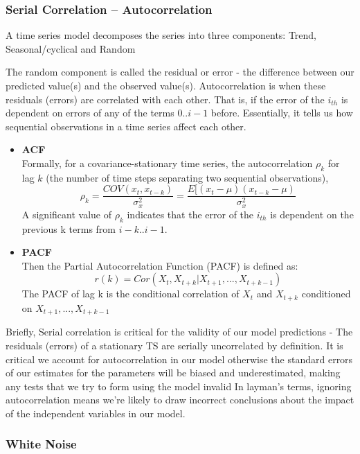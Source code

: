      	\subsubsection {Serial Correlation – Autocorrelation}
A time series model decomposes the series into three components: Trend, Seasonal/cyclical and Random

The random component is called the residual or error - the difference between our predicted value(s) and the observed value(s). Autocorrelation is when these residuals (errors) are correlated with each other. That is, if the error of the $i_{th}$ is dependent on errors of any of the terms $0 .. i-1$ before. Essentially, it tells us how sequential observations in a time series affect each other.
		\begin{itemize}
          \item  \textbf{ACF} \\
Formally, for a covariance-stationary time series, the autocorrelation $\rho_k$ for lag $k$ (the number of time steps separating two sequential observations), 
$$\rho_k = \frac{COV(x_t, x_{t - k})}{\sigma_x^2} = \frac{E[(x_t - \mu)(x_{t - k} - \mu)}{\sigma_x^2}$$ 
A significant value of $\rho_k$ indicates that the error of the $i_{th}$ is dependent on the previous k terms from ${i-k} .. {i-1}$. 
\\
          \item  \textbf{PACF} \\
Then the Partial Autocorrelation Function (PACF) is defined as:
$$r(k) = Cor(X_t,X_{t+k}|X_{t+1},...,X_{t+k-1})$$ 
The PACF of lag k is the conditional correlation of $X_t$ and $X_{t+k}$ conditioned on $X_{t+1},...,X_{t+k-1}$
        \end{itemize}

Briefly, Serial correlation is critical for the validity of our model predictions - The residuals (errors) of a stationary TS are serially uncorrelated by definition. It is critical we account for autocorrelation in our model otherwise the standard errors of our estimates for the parameters will be biased and underestimated, making any tests that we try to form using the model invalid In layman's terms, ignoring autocorrelation means we're likely to draw incorrect conclusions about the impact of the independent variables in our model.

        \subsubsection {White Noise}
        
